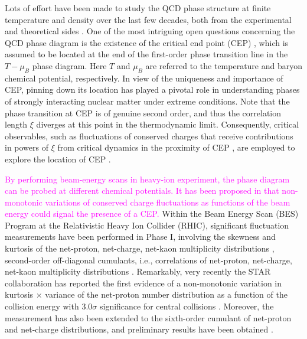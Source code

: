 \documentclass[%
reprint,
superscriptaddress,
showpacs,preprintnumbers,
 amsmath,amssymb,
 aps,
prd,
]{revtex4-1}
\newcommand{\colfab}[1]{\textcolor{magenta}{#1}}
\begin{document}
Lots of effort have been made to study the QCD phase structure at finite temperature and density over the last few decades, both from the experimental and theoretical sides \cite{Luo:2017faz,Bzdak:2019pkr,Fischer:2018sdj,Fu:2019hdw}. One of the most intriguing open questions concerning the QCD phase diagram is the existence of the critical end point (CEP) \cite{Stephanov:2007fk}, which is assumed to be located at the end of the first-order phase transition line in the $T-\mu_B$ phase diagram. Here $T$ and $\mu_B$ are referred to the temperature and baryon chemical potential, respectively. In view of the uniqueness and importance of CEP, pinning down its location has played a pivotal role in understanding phases of strongly interacting nuclear matter under extreme conditions. Note that the phase transition at CEP is of genuine second order, and thus the correlation length $\xi$ diverges at this point in the thermodynamic limit. Consequently, critical observables, such as fluctuations of conserved charges that receive contributions in powers of $\xi$ from critical dynamics in the proximity of CEP \cite{Stephanov:2008qz}, are employed to explore the location of CEP \cite{Luo:2017faz,Adam:2020unf}.

\colfab{
By performing beam-energy scans in heavy-ion experiment, the phase diagram can be probed at different chemical potentials. It has been proposed in \cite{Stephanov:1999zu, Stephanov:2008qz, Stephanov:2011pb} that non-monotonic variations of conserved charge fluctuations as functions of the beam energy could signal the presence of a CEP.
}
Within the Beam Energy Scan (BES) Program at the Relativistic Heavy Ion Collider (RHIC), significant fluctuation measurements have been performed in Phase I, involving the skewness and kurtosis of the net-proton, net-charge, net-kaon multiplicity distributions \cite{Adamczyk:2013dal,Adamczyk:2014fia,Luo:2015ewa,Adamczyk:2017wsl}, second-order off-diagonal cumulants, i.e., correlations of net-proton, net-charge, net-kaon multiplicity distributions \cite{Adam:2019xmk}. Remarkably, very recently the STAR collaboration has reported the first evidence of a non-monotonic variation in kurtosis $\times$ variance of the net-proton number distribution as a function of the collision energy with $3.0\sigma$ significance for central collisions \cite{Adam:2020unf}. Moreover, the measurement has also been extended to the sixth-order cumulant of net-proton and net-charge distributions, and preliminary results have been obtained \cite{Nonaka:2020crv,Pandav:2020uzx}.
\end{document}
